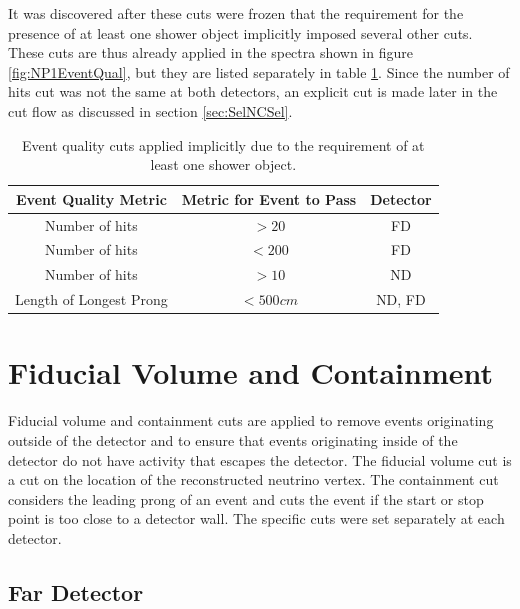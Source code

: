 It was discovered after these cuts were frozen that the requirement for the presence of at least one shower object implicitly imposed several other cuts. These cuts are thus already applied in the spectra shown in figure \ref{fig:NP1EventQual}, but they are listed separately in table \ref{tab:NuePresel}. Since the number of hits cut was not the same at both detectors, an explicit cut is made later in the cut flow as discussed in section \ref{sec:SelNCSel}.
\begin{table}[p]
  \begin{center}
    \caption[Implicit Event Quality Cuts]{Event quality cuts applied implicitly due to the requirement of at least one shower object.}
    \label{tab:NuePresel}
    \begin{tabular}{c c c}
      \hline\hline
      Event Quality Metric & Metric for Event to Pass & Detector \\
      \hline
      Number of hits & $> 20$ & FD \\
      Number of hits & $< 200$ & FD \\
      Number of hits & $> 10$ & ND \\
      Length of Longest Prong & $< 500\unit{cm}$ & ND, FD \\
      \hline
    \end{tabular}
  \end{center}
\end{table}

\section{Fiducial Volume and Containment}
\label{sec:SelFidCont}

Fiducial volume and containment cuts are applied to remove events originating outside of the detector and to ensure that events originating inside of the detector do not have activity that escapes the detector. The fiducial volume cut is a cut on the location of the reconstructed neutrino vertex. The containment cut considers the leading prong of an event and cuts the event if the start or stop point is too close to a detector wall. The specific cuts were set separately at each detector.

\subsection{Far Detector}
\label{sec:SelFidContFD}

